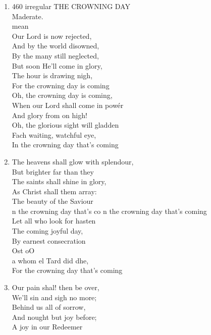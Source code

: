 \documentclass[11pt,a4paper]{article}
\begin{document}
\begin{enumerate}
    \item 460 irregular THE CROWNING DAY \\
        Maderate. \\
        mean \\
        Our Lord is now rejected, \\
        And by the world disowned, \\
        By the many still neglected, \\
        But soon He'll come in glory, \\
        The hour is drawing nigh, \\
        For the crowning day is coming \\
        Oh, the crowning day is coming, \\
        When our Lord shall come in powér \\
        And glory from on high! \\
        Oh, the glorious sight will gladden \\
        Fach waiting, watchful eye, \\
        In the crowning day that's coming

    \item The heavens shall glow with splendour, \\
        But brighter far than they \\
        The saints shall shine in glory, \\
        As Christ shall them array: \\
        The beauty of the Saviour \\
        n the crowning day that's co n the crowning day that's coming \\
        Let all who look for hasten \\
        The coming joyful day, \\
        By earnest consecration \\
        Ost oO \\
        a whom el Tard did dhe, \\
        For the crowning day that's coming

    \item Our pain shal! then be over, \\
        We'll sin and sigh no more; \\
        Behind us all of sorrow, \\
        And nought but joy before; \\
        A joy in our Redeemer

\end{enumerate}
\end{document}
